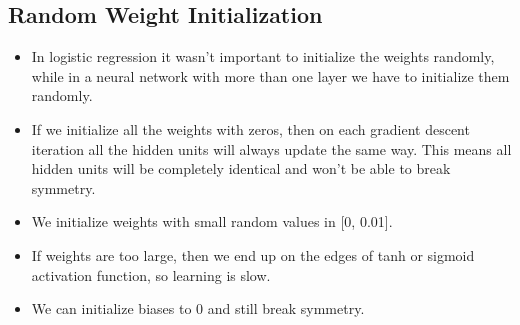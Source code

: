 \subsection{Random Weight Initialization}

\begin{itemize}[wide, labelwidth=!, labelindent=0pt]
\itemsep0em 
    \item In logistic regression it wasn't important to initialize the weights randomly, while in a neural network with more than one layer we have to initialize them randomly.
    \item If we initialize all the weights with zeros, then on each gradient descent iteration all the hidden units will always update the same way. This means all hidden units will be completely identical and won't be able to break symmetry.
    \item We initialize weights with small random values in [0, 0.01].
    \item If weights are too large, then we end up on the edges of tanh or sigmoid activation function, so learning is slow. 
    \item We can initialize biases to 0 and still break symmetry. \vspace*{-\baselineskip}
\end{itemize}
